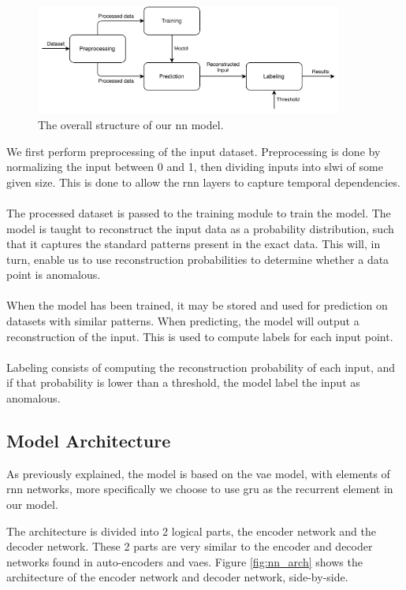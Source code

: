 \begin{figure}[htbp]
    \centering
    \includegraphics[width=0.9\textwidth]{Pictures/Sprint_3/NetworkStructure.pdf}
    \caption{The overall structure of our \gls{nn} model.}
    \label{fig:nn_struct}
\end{figure}
\noindent
We first perform preprocessing of the input dataset. Preprocessing is done by normalizing the input between 0 and 1, then dividing inputs into \gls{slwi} of some given size. This is done to allow the \gls{rnn} layers to capture temporal dependencies.
\\\\
The processed dataset is passed to the training module to train the model. The model is taught to reconstruct the input data as a probability distribution, such that it captures the standard patterns present in the exact data. This will, in turn, enable us to use reconstruction probabilities to determine whether a data point is anomalous.
\\\\
When the model has been trained, it may be stored and used for prediction on datasets with similar patterns. When predicting, the model will output a reconstruction of the input. This is used to compute labels for each input point.                            
\\\\
Labeling consists of computing the reconstruction probability of each input, and if that probability is lower than a threshold, the model label the input as anomalous.

\subsection{Model Architecture}
As previously explained, the model is based on the \gls{vae} model, with elements of \gls{rnn} networks, more specifically we choose to use \gls{gru} as the recurrent element in our model.

The architecture is divided into 2 logical parts, the encoder network and the decoder network. These 2 parts are very similar to the encoder and decoder networks found in auto-encoders and \glspl{vae}. Figure \ref{fig:nn_arch} shows the architecture of the encoder network and decoder network, side-by-side.

